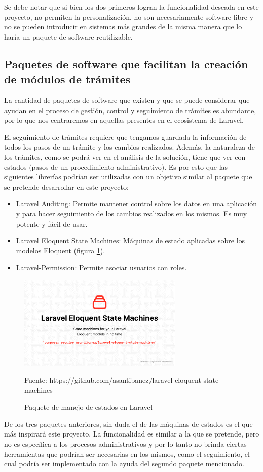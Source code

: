 Se debe notar que si bien los dos primeros logran la funcionalidad deseada en este proyecto, no permiten la personalización, no son necesariamente software libre y no se pueden introducir en sistemas más grandes de la misma manera que lo haría un paquete de software reutilizable.

\subsection{Paquetes de software que facilitan la creación de módulos de trámites}

La cantidad de paquetes de software que existen y que se puede considerar que ayudan en el proceso de gestión, control y seguimiento de trámites es abundante, por lo que nos centraremos en aquellas presentes en el ecosistema de Laravel.

El seguimiento de trámites requiere que tengamos guardada la información de todos los pasos de un trámite y los cambios realizados. Además, la naturaleza de los trámites, como se podrá ver en el análisis de la solución, tiene que ver con estados (pasos de un procedimiento administrativo). Es por esto que las siguientes librerías podrían ser utilizadas con un objetivo similar al paquete que se pretende desarrollar en este proyecto:

\begin{itemize}
    \item Laravel Auditing: Permite mantener control sobre los datos en una aplicación y para hacer seguimiento de los cambios realizados en los mismos. Es muy potente y fácil de usar.
    \item Laravel Eloquent State Machines: Máquinas de estado aplicadas sobre los modelos Eloquent (figura \ref{fig:laravelstatemachines}).
    \item Laravel-Permission: Permite asociar usuarios con roles.
\end{itemize}

\begin{figure}[!h]
    \centering
    \includegraphics[width=0.7\textwidth]{assets/laravelstatemachines}
    \caption{Paquete de manejo de estados en Laravel}{Fuente: https://github.com/asantibanez/laravel-eloquent-state-machines}
    \label{fig:laravelstatemachines}
\end{figure}

De los tres paquetes anteriores, sin duda el de las máquinas de estados es el que más inspirará este proyecto. La funcionalidad es similar a la que se pretende, pero no es específica a los procesos administrativos y por lo tanto no brinda ciertas herramientas que podrían ser necesarias en los mismos, como el seguimiento, el cual podría ser implementado con la ayuda del segundo paquete mencionado.
